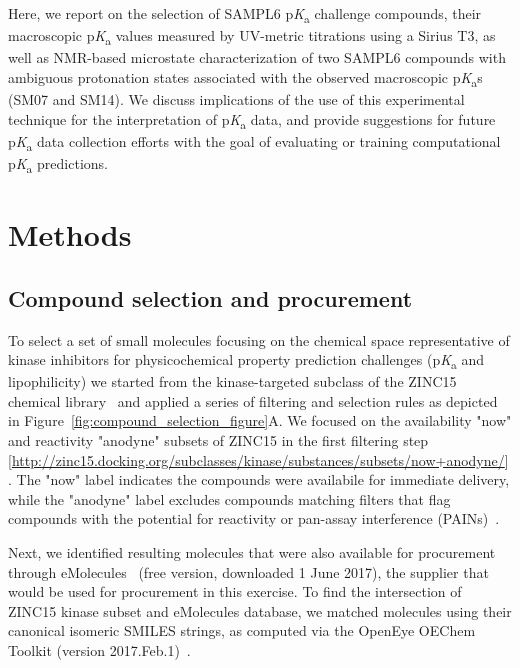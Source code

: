 \documentclass[9pt,lineno]{elife}
\newcommand{\pKa}{p\textit{K}\textsubscript{a}}
\begin{document}
Here, we report on the selection of SAMPL6 \pKa{} challenge compounds, their macroscopic \pKa{} values measured by UV-metric titrations using a Sirius T3, as well as NMR-based microstate characterization of two SAMPL6 compounds with ambiguous protonation states associated with the observed macroscopic \pKa{}s (SM07 and SM14). 
We discuss implications of the use of this experimental technique for the interpretation of \pKa{} data, and provide suggestions for future \pKa{} data collection efforts with the goal of evaluating or training computational \pKa{} predictions.

\section{Methods}

\subsection{Compound selection and procurement}

To select a set of small molecules focusing on the chemical space representative of kinase inhibitors for physicochemical property prediction challenges (\pKa{} and lipophilicity) we started from the kinase-targeted subclass of the ZINC15 chemical library~\citep{sterling_zinc_2015} and applied a series of filtering and selection rules as depicted in Figure~\ref{fig:compound_selection_figure}A. 
We focused on the availability "now" and reactivity "anodyne" subsets of ZINC15 in the first filtering step [\url{http://zinc15.docking.org/subclasses/kinase/substances/subsets/now+anodyne/}]. 
The "now" label indicates the compounds were availabile for immediate delivery, while the "anodyne" label excludes compounds matching filters that flag compounds with the potential for reactivity or pan-assay interference (PAINs)~\citep{baell_new_2010, saubern_knime_2011}. 

Next, we identified resulting molecules that were also available for procurement through eMolecules~\citep{eMolecules_ref_2017} (free version, downloaded 1 June 2017), the supplier that would be used for procurement in this exercise. 
To find the intersection of ZINC15 kinase subset and eMolecules database, we matched molecules using their canonical isomeric SMILES strings, as computed via the OpenEye OEChem Toolkit (version 2017.Feb.1)~\citep{oechem_openeye_2017}.
\end{document}
